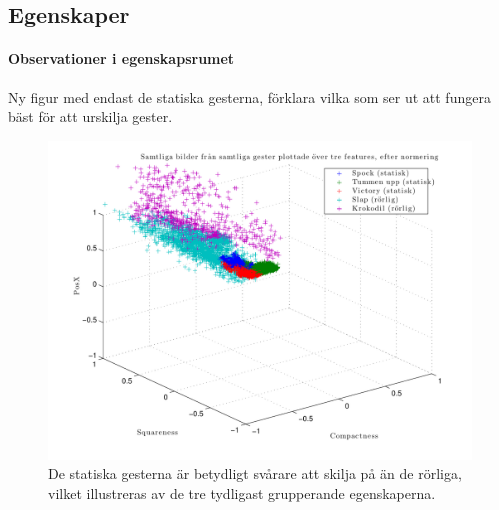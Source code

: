 \documentclass[../rapport_MVEX01-11-05]{subfiles}
\begin{document}
\subsection{Egenskaper}

\paragraph{Observationer i egenskapsrumet}

Ny figur med endast de statiska gesterna, förklara vilka som ser ut
att fungera bäst för att urskilja gester.


\begin{figure}[htbp]
  \centering
  \includegraphics[width=\textwidth]{bilder/feats-1+6+7}
  \caption{De statiska gesterna är betydligt svårare att skilja på än
  de rörliga, vilket illustreras av de tre tydligast grupperande
  egenskaperna.}
  \label{fig:feats167}
\end{figure}
\end{document}
